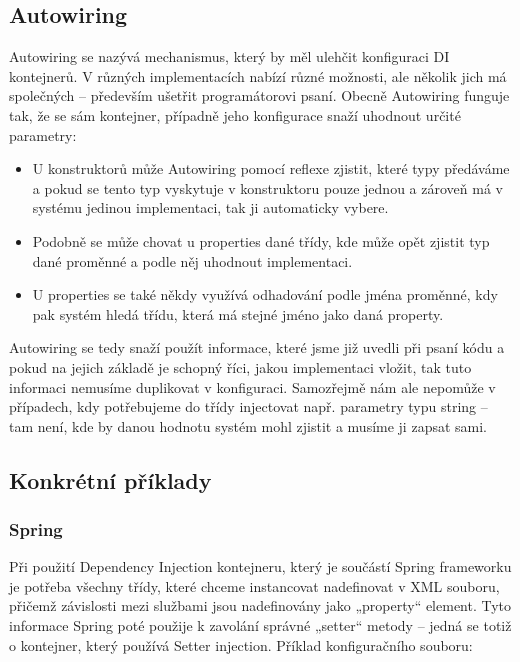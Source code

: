 \documentclass[a4paper,conference]{IEEEtran}
\begin{document}
\subsection{Autowiring}

Autowiring se nazývá mechanismus, který by měl ulehčit konfiguraci DI kontejnerů. V různých implementacích nabízí různé možnosti, ale několik jich má společných – především ušetřit programátorovi psaní. Obecně Autowiring funguje tak, že se sám kontejner, případně jeho konfigurace snaží uhodnout určité parametry:
\begin{itemize}
\item U konstruktorů může Autowiring pomocí reflexe zjistit, které typy předáváme a pokud se tento typ vyskytuje v konstruktoru pouze jednou a zároveň má v systému jedinou implementaci, tak ji automaticky vybere.
\item Podobně se může chovat u properties dané třídy, kde může opět zjistit typ dané proměnné a podle něj uhodnout implementaci.
\item U properties se také někdy využívá odhadování podle jména proměnné, kdy pak systém hledá třídu, která má stejné jméno jako daná property.
\end{itemize}

Autowiring se tedy snaží použít informace, které jsme již uvedli při psaní kódu a pokud na jejich základě je schopný říci, jakou implementaci vložit, tak tuto informaci nemusíme duplikovat v konfiguraci. Samozřejmě nám ale nepomůže v případech, kdy potřebujeme do třídy injectovat např. parametry typu string – tam není, kde by danou hodnotu systém mohl zjistit a musíme ji zapsat sami.

\subsection{Konkrétní příklady}

\subsubsection{Spring}

Při použití Dependency Injection kontejneru, který je součástí Spring frameworku je potřeba všechny třídy, které chceme instancovat nadefinovat v XML souboru, přičemž závislosti mezi službami jsou nadefinovány jako „property“ element. Tyto informace Spring poté použije k zavolání správné „setter“ metody – jedná se totiž o kontejner, který používá Setter injection. Příklad konfiguračního souboru:
\end{document}
